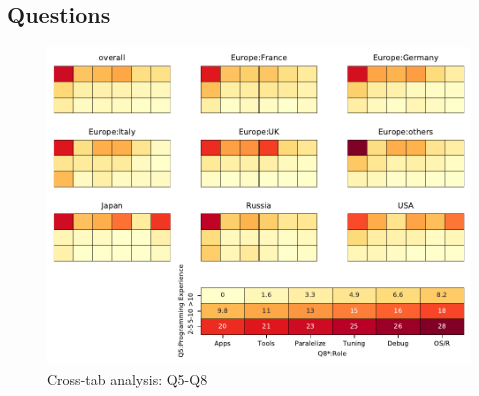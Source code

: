
\subsection{Questions}


\begin{figure}
\begin{center}
\includegraphics[width=12cm]{../pdfs/Q5-Q8.pdf}
\caption{Cross-tab analysis: Q5-Q8}
\label{fig:Q5-Q8}
\end{center}
\end{figure}
